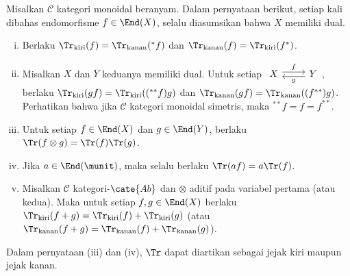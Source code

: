 \begin{proposition}\label{prop:trace}
	Misalkan $\mathcal{C}$ kategori monoidal beranyam. Dalam pernyataan
berikut, setiap kali dibahas endomorfisme $f\in\End(X)$, selalu diasumsikan
bahwa $X$ memiliki dual.
	\begin{enumerate}[(i)]
		\item Berlaku
		$\Tr_{\text{kiri}}(f)=\Tr_{\text{kanan}}({}^*f)$ dan
		$\Tr_{\text{kanan}}(f)=\Tr_{\text{kiri}}(f^*)$.
		\item Misalkan $X$ dan $Y$ keduanya memiliki dual. Untuk setiap
		$\begin{tikzcd} X \arrow[shift left, r, "f"] & Y \arrow[shift left, l, "g"] \end{tikzcd}$,
		berlaku
		$\Tr_{\text{kiri}}(gf)=\Tr_{\text{kiri}}(({}^{**}f)g)$ dan
		$\Tr_{\text{kanan}}(gf)=\Tr_{\text{kanan}}((f^{**})g)$.
		Perhatikan bahwa jika $\mathcal{C}$ kategori monoidal simetris, maka
		${}^{**}f=f=f^{**}$.
		\item Untuk setiap $f\in\End(X)$ dan $g\in\End(Y)$, berlaku
		$\Tr(f\otimes g)=\Tr(f)\Tr(g)$.
		\item Jika $a\in\End(\munit)$, maka selalu berlaku
		$\Tr(af)=a\Tr(f)$.
		\item Misalkan $\mathcal{C}$ kategori-$\cate{Ab}$ dan $\otimes$
		aditif pada variabel pertama (atau kedua). Maka untuk setiap
		$f,g\in\End(X)$ berlaku
		$\Tr_{\text{kiri}}(f+g)=\Tr_{\text{kiri}}(f)+\Tr_{\text{kiri}}(g)$
		(atau
		$\Tr_{\text{kanan}}(f+g)=\Tr_{\text{kanan}}(f)+\Tr_{\text{kanan}}(g)$).
	\end{enumerate}
	Dalam pernyataan (iii) dan (iv), $\Tr$ dapat diartikan sebagai jejak kiri
maupun jejak kanan.
\end{proposition}
